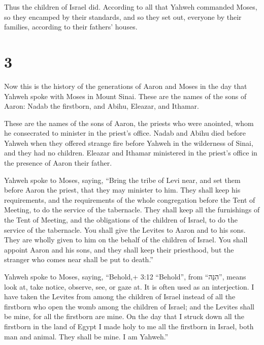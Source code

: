  Thus the children of Israel did. According to all that
Yahweh commanded Moses, so they encamped by their standards, and so they
set out, everyone by their families, according to their fathers' houses.

\hypertarget{section-2}{%
\section{3}\label{section-2}}

 Now this is the history of the generations of Aaron and
Moses in the day that Yahweh spoke with Moses in Mount Sinai.
 These are the names of the sons of Aaron: Nadab the
firstborn, and Abihu, Eleazar, and Ithamar.

 These are the names of the sons of Aaron, the priests who
were anointed, whom he consecrated to minister in the priest's office.
 Nadab and Abihu died before Yahweh when they offered
strange fire before Yahweh in the wilderness of Sinai, and they had no
children. Eleazar and Ithamar ministered in the priest's office in the
presence of Aaron their father.

 Yahweh spoke to Moses, saying,  ``Bring the
tribe of Levi near, and set them before Aaron the priest, that they may
minister to him.  They shall keep his requirements, and the
requirements of the whole congregation before the Tent of Meeting, to do
the service of the tabernacle.  They shall keep all the
furnishings of the Tent of Meeting, and the obligations of the children
of Israel, to do the service of the tabernacle.  You shall
give the Levites to Aaron and to his sons. They are wholly given to him
on the behalf of the children of Israel.  You shall appoint
Aaron and his sons, and they shall keep their priesthood, but the
stranger who comes near shall be put to death.''

 Yahweh spoke to Moses, saying,  ``Behold,+
3:12 ``Behold'', from ``הִנֵּה'', means look at, take notice, observe,
see, or gaze at. It is often used as an interjection. I have taken the
Levites from among the children of Israel instead of all the firstborn
who open the womb among the children of Israel; and the Levites shall be
mine,  for all the firstborn are mine. On the day that I
struck down all the firstborn in the land of Egypt I made holy to me all
the firstborn in Israel, both man and animal. They shall be mine. I am
Yahweh.''

